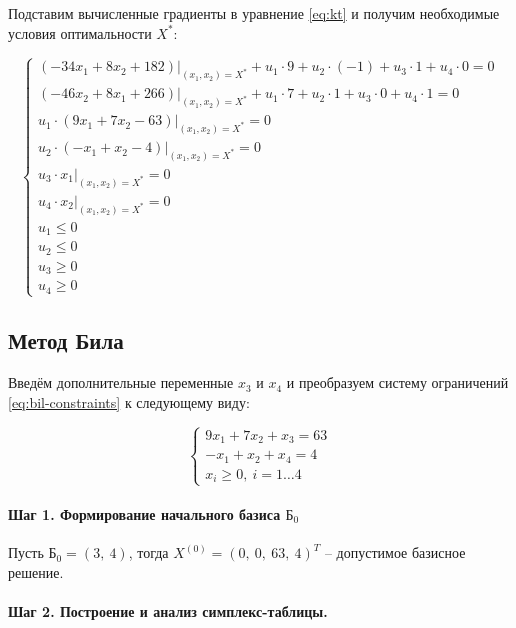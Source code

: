 Подставим вычисленные градиенты в уравнение \ref{eq:kt} и получим необходимые условия оптимальности $X^*$:

\begin{equation*}
	\begin{cases}
		\left( -34 x_1 + 8 x_2 + 182 \right) \Big|_{(x_1, x_2) = X^*} + u_1 \cdot 9 + u_2 \cdot (-1) + u_3 \cdot 1 + u_4 \cdot 0 = 0
		\\
		\left( -46 x_2 + 8 x_1 + 266 \right) \Big|_{(x_1, x_2) = X^*} + u_1 \cdot 7 + u_2 \cdot 1 + u_3 \cdot 0 + u_4 \cdot 1 = 0
		\\
		u_1 \cdot (9 x_1 + 7 x_2 - 63) \Big|_{(x_1, x_2) = X^*} = 0
		\\
		u_2 \cdot (-x_1 + x_2 - 4) \Big|_{(x_1, x_2) = X^*} = 0
		\\
		u_3 \cdot x_1 \Big|_{(x_1, x_2) = X^*} = 0
		\\
		u_4 \cdot x_2 \Big|_{(x_1, x_2) = X^*} = 0
		\\
		u_1 \leq 0
		\\
		u_2 \leq 0
		\\
		u_3 \geq 0
		\\
		u_4 \geq 0\
	\end{cases}
\end{equation*}

\subsection{Метод Била}

Введём дополнительные переменные $x_3$ и $x_4$ и преобразуем систему ограничений \ref{eq:bil-constraints} к следующему виду:

\begin{equation*}
\begin{cases}
	9 x_1 + 7 x_2 + x_3 = 63
	\\
	- x_1 + x_2 + x_4 = 4
	\\
	x_i \geq 0,\ i = 1 \dots 4
\end{cases}
\end{equation*}

\paragraph{Шаг 1. Формирование начального базиса $\text{Б}_0$}

Пусть $\text{Б}_0 = (3,\ 4)$, тогда $X^{(0)} = (0,\ 0,\ 63,\ 4)^T$ -- допустимое базисное решение.

\paragraph{Шаг 2. Построение и анализ симплекс-таблицы.}

